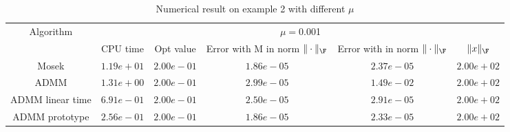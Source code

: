 \begin{table}
\centering
\begin{tabular}{|c|c|c|c|c|c|}

\hline
\multirow{2}{*}{ Algorithm} &\multicolumn{5}{c|}{$\mu=$0.001}\\\cline{2-6}
 &CPU time &Opt value &Error with M in norm $\|\cdot\|_\F$ &Error with in norm $\|\cdot\|_\F$ &$\|x\|_\F$\\\hline
Mosek & $1.19e+01$ & $2.00e-01$ & $1.86e-05$ & $2.37e-05$ & $2.00e+02$\\\hline
ADMM & $1.31e+00$ & $2.00e-01$ & $2.99e-05$ & $1.49e-02$ & $2.00e+02$\\\hline
ADMM linear time & $6.91e-01$ & $2.00e-01$ & $2.50e-05$ & $2.91e-05$ & $2.00e+02$\\\hline
ADMM prototype & $2.56e-01$ & $2.00e-01$ & $1.86e-05$ & $2.33e-05$ & $2.00e+02$\\\hline
\end{tabular}
\caption{Numerical result on example 2 with different $\mu$\label{example2}}
\end{table}

